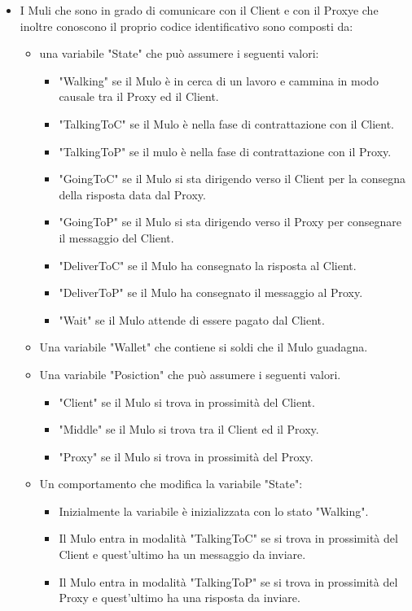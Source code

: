\documentclass[13pt,a4paper]{article}
\begin{document}
\begin{itemize}
		
		\item I Muli che sono in grado di comunicare con il Client e con il Proxye che inoltre conoscono il proprio codice identificativo sono composti da:
		\begin{itemize}
			\item una variabile "State" che può assumere i seguenti valori:
			\begin{itemize}
				\item "Walking" se il Mulo è in cerca di un lavoro e cammina in modo causale tra il Proxy ed il Client.
				\item "TalkingToC" se il Mulo è nella fase di contrattazione con il Client.
				\item "TalkingToP" se il mulo è nella fase di contrattazione con il Proxy.
				\item "GoingToC" se il Mulo si sta dirigendo verso il Client per la consegna della risposta data dal Proxy.
				\item "GoingToP" se il Mulo si sta dirigendo verso il Proxy per consegnare il messaggio del Client.
				\item "DeliverToC" se il Mulo ha consegnato la risposta al Client.
				\item "DeliverToP" se il Mulo ha consegnato il messaggio al Proxy.
				\item "Wait" se il Mulo attende di essere pagato dal Client.
			\end{itemize}
		\item Una variabile "Wallet" che contiene si soldi che il Mulo guadagna.
		\item Una variabile "Posiction" che può assumere i seguenti valori.
		\begin{itemize}
			\item "Client" se il Mulo si trova in prossimità del Client.
			\item "Middle" se il Mulo si trova tra il Client ed il Proxy.
			\item "Proxy" se il Mulo si trova in prossimità del Proxy.
		\end{itemize}
	\item Un comportamento che modifica la variabile "State":
	\begin{itemize}
		\item Inizialmente la variabile è inizializzata con lo stato "Walking".
		\item Il Mulo entra in modalità "TalkingToC" se si trova in prossimità del Client e quest'ultimo ha un messaggio da inviare.
		\item Il Mulo entra in modalità "TalkingToP" se si trova in prossimità del Proxy e quest'ultimo ha una risposta da inviare.

\end{itemize}
\end{itemize}
\end{itemize}
\end{document}

